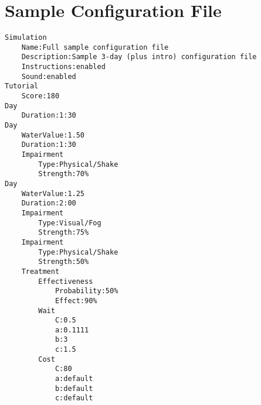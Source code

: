\documentclass{article}
\begin{document}
%    
    
\pagebreak\section*{Sample Configuration File}
\begin{lstlisting}
Simulation
    Name:Full sample configuration file
    Description:Sample 3-day (plus intro) configuration file  
    Instructions:enabled
    Sound:enabled
Tutorial
    Score:180
Day
    Duration:1:30
Day
    WaterValue:1.50
    Duration:1:30
    Impairment
        Type:Physical/Shake
        Strength:70%
Day
    WaterValue:1.25
    Duration:2:00
    Impairment
        Type:Visual/Fog
        Strength:75%
    Impairment
        Type:Physical/Shake
        Strength:50%
    Treatment
        Effectiveness
            Probability:50%
            Effect:90%
        Wait
            C:0.5
            a:0.1111
            b:3
            c:1.5
        Cost
            C:80
            a:default
            b:default
            c:default
\end{lstlisting}    
\end{document}
